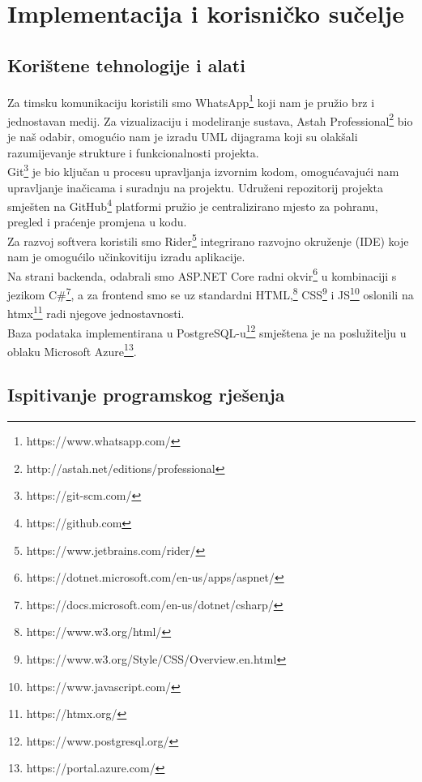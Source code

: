 \chapter{Implementacija i korisničko sučelje}
		
		
		\section{Korištene tehnologije i alati}
		
			
			 
			 Za timsku komunikaciju koristili smo WhatsApp\footnote{https://www.whatsapp.com/} koji nam je pružio brz i jednostavan medij. Za vizualizaciju i modeliranje sustava, Astah Professional\footnote{http://astah.net/editions/professional} bio je naš odabir, omogućio nam je izradu UML dijagrama koji su olakšali razumijevanje strukture i funkcionalnosti projekta.\\
			 
			 Git\footnote{https://git-scm.com/} je bio ključan u procesu upravljanja izvornim kodom, omogućavajući nam upravljanje inačicama i suradnju na projektu. Udruženi repozitorij projekta smješten na GitHub\footnote{https://github.com} platformi pružio je centralizirano mjesto za pohranu, pregled i praćenje promjena u kodu.\\
			 
			 Za razvoj softvera koristili smo Rider\footnote{https://www.jetbrains.com/rider/} integrirano razvojno okruženje (IDE) koje nam je omogućilo učinkovitiju izradu aplikacije.\\
			 
			 Na strani backenda, odabrali smo ASP.NET Core radni okvir\footnote{https://dotnet.microsoft.com/en-us/apps/aspnet/} u kombinaciji s jezikom C\#\footnote{https://docs.microsoft.com/en-us/dotnet/csharp/}, a za frontend smo se uz standardni HTML,\footnote{https://www.w3.org/html/} CSS\footnote{https://www.w3.org/Style/CSS/Overview.en.html} i JS\footnote{https://www.javascript.com/} oslonili na htmx\footnote{https://htmx.org/} radi njegove jednostavnosti.\\
			 
			 Baza podataka implementirana u PostgreSQL-u\footnote{https://www.postgresql.org/} smještena je na poslužitelju u oblaku Microsoft Azure\footnote{https://portal.azure.com/}.\newline
			
			
			\eject 
		
	
		\section{Ispitivanje programskog rješenja}
			
